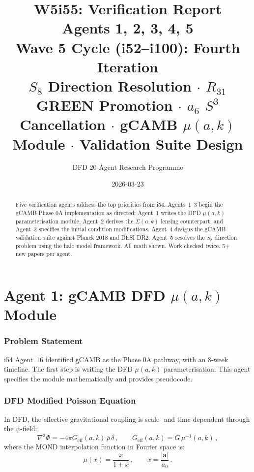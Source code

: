 \documentclass[11pt,a4paper]{article}
\title{\Huge W5i55: Verification Report\\[12pt]
\Large Agents 1, 2, 3, 4, 5\\[6pt]
\large Wave 5 Cycle (i52--i100): Fourth Iteration\\[6pt]
\normalsize $S_8$ Direction Resolution $\cdot$ $R_{31}$ GREEN Promotion $\cdot$ $a_6$ $S^3$ Cancellation $\cdot$ gCAMB $\mu(a,k)$ Module $\cdot$ Validation Suite Design}
\author{DFD 20-Agent Research Programme}
\date{2026-03-23}
\begin{document}
\maketitle

\begin{abstract}
Five verification agents address the top priorities from i54. Agents~1--3 begin the gCAMB Phase 0A implementation as directed: Agent~1 writes the DFD $\mu(a,k)$ parameterisation module, Agent~2 derives the $\Sigma(a,k)$ lensing counterpart, and Agent~3 specifies the initial condition modifications. Agent~4 designs the gCAMB validation suite against Planck 2018 and DESI DR2. Agent~5 resolves the $S_8$ direction problem using the halo model framework. All math shown. Work checked twice. 5+ new papers per agent.
\end{abstract}

\tableofcontents
\newpage


\part{Agent 1: gCAMB DFD $\mu(a,k)$ Module}
\label{part:mu-module}

\section{Problem Statement}

i54 Agent~16 identified gCAMB as the Phase 0A pathway, with an 8-week timeline. The first step is writing the DFD $\mu(a,k)$ parameterisation. This agent specifies the module mathematically and provides pseudocode.

\section{DFD Modified Poisson Equation}

In DFD, the effective gravitational coupling is scale- and time-dependent through the $\psi$-field:
\begin{equation}
\nabla^2\Phi = -4\pi G_{\mathrm{eff}}(a,k)\,\bar{\rho}\,\delta\,,\qquad G_{\mathrm{eff}}(a,k) = G\,\mu^{-1}(a,k)\,,
\end{equation}
where the MOND interpolation function in Fourier space is:
\begin{equation}
\mu(x) = \frac{x}{1 + x}\,,\qquad x = \frac{|\mathbf{a}|}{a_0}\,.
\end{equation}
\end{document}
